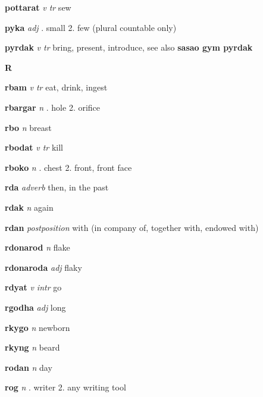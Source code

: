 \textbf{pottarat}   \emph{v tr} \textperiodcentered sew

\textbf{pyka}   \emph{adj} . small 2. few (plural countable only) 

\textbf{pyrdak}   \emph{v tr} \textperiodcentered bring, present, introduce, see also \textbf{sasao gym pyrdak}

\begin{center} \Huge \bfseries R \end{center}\textbf{rbam}   \emph{v tr} \textperiodcentered eat, drink, ingest

\textbf{rbargar}   \emph{n} . hole 2. orifice 

\textbf{rbo}   \emph{n} \textperiodcentered breast

\textbf{rbodat}   \emph{v tr} \textperiodcentered kill

\textbf{rboko}   \emph{n} . chest 2. front, front face 

\textbf{rda}   \emph{adverb} \textperiodcentered then, in the past

\textbf{rdak}   \emph{n} \textperiodcentered again

\textbf{rdan}   \emph{postposition} \textperiodcentered with (in company of, together with, endowed with)

\textbf{rdonarod}   \emph{n} \textperiodcentered flake

\textbf{rdonaroda}   \emph{adj} \textperiodcentered flaky

\textbf{rdyat}   \emph{v intr} \textperiodcentered go

\textbf{rgodha}   \emph{adj} \textperiodcentered long

\textbf{rkygo}   \emph{n} \textperiodcentered newborn

\textbf{rkyng}   \emph{n} \textperiodcentered beard

\textbf{rodan}   \emph{n} \textperiodcentered day

\textbf{rog}   \emph{n} . writer 2. any writing tool 

